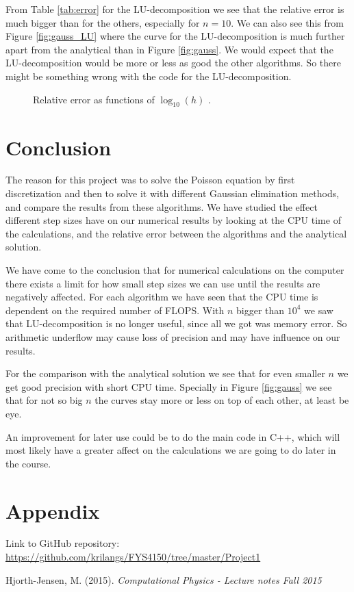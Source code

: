 \documentclass[12pt,a4paper,english]{article}
\begin{document}
From Table \ref{tab:error} for the LU-decomposition we see that the relative error is much bigger than for the others, especially for $n=10$. We can also see this from Figure \ref{fig:gauss_LU} where the curve for the LU-decomposition is much further apart from the analytical than in Figure \ref{fig:gauss}. We would expect that the LU-decomposition would be more or less as good the other algorithms. So there might be something wrong with the code for the LU-decomposition.
\begin{figure}[htbp]
	\caption{Relative error as functions of $\log_{10}(h)$ .\label{fig:rel_error}}
\end{figure}

\section{Conclusion}
The reason for this project was to solve the Poisson equation by first discretization and then to solve it with different Gaussian elimination methods, and compare the results from these algorithms. We have studied the effect different step sizes have on our numerical results by looking at the CPU time of the calculations, and the relative error between the algorithms and the analytical solution. 

We have come to the conclusion that for numerical calculations on the computer there exists a limit for how small step sizes we can use until the results are negatively affected. For each algorithm we have seen that the CPU time is dependent on the required number of FLOPS. With $n$ bigger than $10^4$ we saw that LU-decomposition is no longer useful, since all we got was memory error. So arithmetic underflow may cause loss of precision and may have influence on our results.

For the comparison with the analytical solution we see that for even smaller $n$ we get good precision with short CPU time. Specially in Figure \ref{fig:gauss} we see that for not so big $n$ the curves stay more or less on top of each other, at least be eye.

An improvement for later use could be to do the main code in C++, which will most likely have a greater affect on the calculations we are going to do later in the course.

\section{Appendix}
Link to GitHub repository:
\url{https://github.com/krilangs/FYS4150/tree/master/Project1}

\begin{thebibliography}{}
Hjorth-Jensen, M. (2015). \textit{Computational Physics - Lecture notes Fall 2015}

\end{thebibliography}
\end{document}

